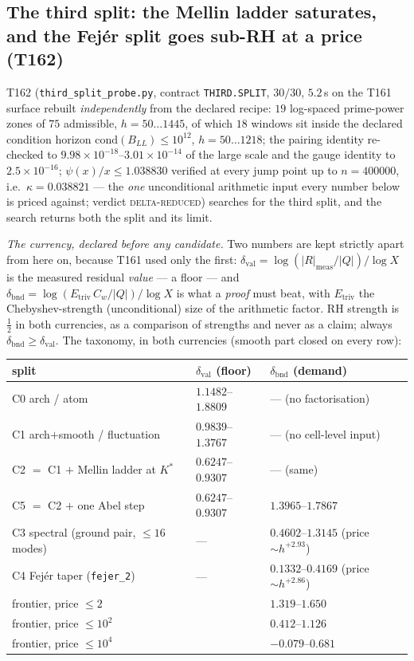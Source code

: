 \documentclass[11pt,a4paper]{article}
\begin{document}
\subsection{The third split: the Mellin ladder saturates, and the Fej\'er split
goes sub-RH at a price (T162)}
T162 (\texttt{third\_split\_probe.py}, contract \texttt{THIRD.SPLIT}, $30/30$,
$5.2$\,s on the T161 surface rebuilt \emph{independently} from the declared
recipe: $19$ log-spaced prime-power zones of $75$ admissible, $h=50\ldots1445$,
of which $18$ windows sit inside the declared condition horizon
$\mathrm{cond}(B_{LL})\le10^{12}$, $h=50\ldots1218$; the pairing identity
re-checked to $9.98\times10^{-18}$--$3.01\times10^{-14}$ of the large scale and
the gauge identity to $2.5\times10^{-16}$; $\psi(x)/x\le1.038830$ verified at
every jump point up to $n=400000$, i.e.\ $\kappa=0.038821$ --- the \emph{one}
unconditional arithmetic input every number below is priced against; verdict
\textsc{delta-reduced}) searches for the third split, and the search returns
both the split and its limit.

\emph{The currency, declared before any candidate.} Two numbers are kept
strictly apart from here on, because T161 used only the first:
$\delta_{\mathrm{val}}=\log(|R|_{\mathrm{meas}}/|Q|)/\log X$ is the measured
residual \emph{value} --- a floor --- and
$\delta_{\mathrm{bnd}}=\log(E_{\mathrm{triv}}\,C_w/|Q|)/\log X$ is what a
\emph{proof} must beat, with $E_{\mathrm{triv}}$ the Chebyshev-strength
(unconditional) size of the arithmetic factor. RH strength is $\tfrac12$ in both
currencies, as a comparison of strengths and never as a claim; always
$\delta_{\mathrm{bnd}}\ge\delta_{\mathrm{val}}$. The taxonomy, in both
currencies (smooth part closed on every row):

\begin{center}\small
\begin{tabular}{@{}l l l@{}}
\toprule
\textbf{split} & \textbf{$\delta_{\mathrm{val}}$ (floor)} & \textbf{$\delta_{\mathrm{bnd}}$ (demand)}\\
\midrule
C0 arch / atom & $1.1482$--$1.8809$ & --- (no factorisation)\\
C1 arch$+$smooth / fluctuation & $0.9839$--$1.3767$ & --- (no cell-level input)\\
C2 $=$ C1 $+$ Mellin ladder at $K^*$ & $0.6247$--$0.9307$ & --- (same)\\
C5 $=$ C2 $+$ one Abel step & $0.6247$--$0.9307$ & $1.3965$--$1.7867$\\
C3 spectral (ground pair, $\le16$ modes) & --- & $0.4602$--$1.3145$ (price $\sim h^{+2.93}$)\\
C4 Fej\'er taper (\texttt{fejer\_2}) & --- & $\boldsymbol{0.1332}$--$\boldsymbol{0.4169}$ (price $\sim h^{+2.86}$)\\
\midrule
frontier, price $\le2$ & & $1.319$--$1.650$\\
frontier, price $\le10^{2}$ & & $0.412$--$1.126$\\
frontier, price $\le10^{4}$ & & $-0.079$--$0.681$\\
\bottomrule
\end{tabular}
\end{center}
\end{document}
